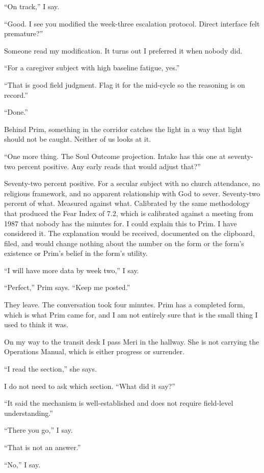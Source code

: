 ``On track,'' I say.

``Good. I see you modified the week-three escalation protocol. Direct interface felt premature?''

Someone read my modification. It turns out I preferred it when nobody did.

``For a caregiver subject with high baseline fatigue, yes.''

``That is good field judgment. Flag it for the mid-cycle so the reasoning is on record.''

``Done.''

Behind Prim, something in the corridor catches the light in a way that light should not be caught. Neither of us looks at it.

``One more thing. The Soul Outcome projection. Intake has this one at seventy-two percent positive. Any early reads that would adjust that?''

Seventy-two percent positive. For a secular subject with no church attendance, no religious framework, and no apparent relationship with God to sever. Seventy-two percent of what. Measured against what. Calibrated by the same methodology that produced the Fear Index of 7.2, which is calibrated against a meeting from 1987 that nobody has the minutes for. I could explain this to Prim. I have considered it. The explanation would be received, documented on the clipboard, filed, and would change nothing about the number on the form or the form's existence or Prim's belief in the form's utility.

``I will have more data by week two,'' I say.

``Perfect,'' Prim says. ``Keep me posted.''

They leave. The conversation took four minutes. Prim has a completed form, which is what Prim came for, and I am not entirely sure that is the small thing I used to think it was.

On my way to the transit desk I pass Meri in the hallway. She is not carrying the Operations Manual, which is either progress or surrender.

``I read the section,'' she says.

I do not need to ask which section. ``What did it say?''

``It said the mechanism is well-established and does not require field-level understanding.''

``There you go,'' I say.

``That is not an answer.''

``No,'' I say.
